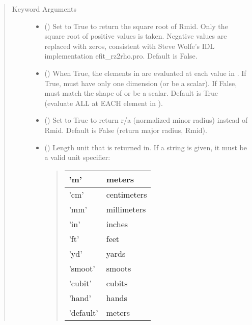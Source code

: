 \documentclass[letterpaper,10pt,english]{sphinxmanual}
\begin{document}
\begin{fulllineitems}
\begin{fulllineitems}
\begin{quote}
\begin{description}
\begin{itemize}
\end{itemize}

\item[{Keyword Arguments}] \leavevmode\begin{itemize}
\item {} 
 () \textendash{} Set to True to return the square root of Rmid. Only
the square root of positive values is taken. Negative values are
replaced with zeros, consistent with Steve Wolfe’s IDL
implementation efit\_rz2rho.pro. Default is False.

\item {} 
 () \textendash{} When True, the elements in  are evaluated at
each value in . If True,  must have only one dimension (or
be a scalar). If False,  must match the shape of  or be
a scalar. Default is True (evaluate ALL  at EACH element in
).

\item {} 
 () \textendash{} Set to True to return r/a (normalized minor radius)
instead of Rmid. Default is False (return major radius, Rmid).

\item {} 
 () \textendash{} 
Length unit that  is returned in.
If a string is given, it must be a valid unit specifier:
\begin{quote}


\begin{savenotes}\sphinxattablestart
\centering
\begin{tabulary}{\linewidth}[t]{|T|T|}
\hline

’m’
&
meters
\\
\hline
’cm’
&
centimeters
\\
\hline
’mm’
&
millimeters
\\
\hline
’in’
&
inches
\\
\hline
’ft’
&
feet
\\
\hline
’yd’
&
yards
\\
\hline
’smoot’
&
smoots
\\
\hline
’cubit’
&
cubits
\\
\hline
’hand’
&
hands
\\
\hline
’default’
&
meters
\\
\hline
\end{tabulary}
\par
\sphinxattableend\end{savenotes}
\end{quote}


\end{itemize}
\end{description}
\end{quote}
\end{fulllineitems}
\end{fulllineitems}
\end{document}
